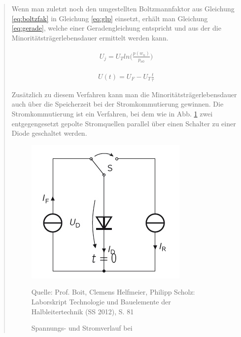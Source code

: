 \begin{quote}
	Wenn man zuletzt noch den umgestellten Boltzmannfaktor aus Gleichung
	\ref{eq:boltzfak} in Gleichung \ref{eq:glp} einsetzt, erhält man Gleichung
	\ref{eq:gerade}, welche einer Geradengleichung entspricht und aus der die
	Minoritätsträgerlebensdauer ermittelt werden kann.

	\begin{equation}
         \begin{split}
             U_{j}=U_{T}ln\Big(\frac{p(w_{n})}{p_{n0}}\Big)
         \end{split}
         \label{eq:boltzfak}
    \end{equation}

	\begin{equation}
         \begin{split}
             U(t)=U_{F}-U_{T}\frac{t}{\tau}
         \end{split}
         \label{eq:gerade}
    \end{equation}

	Zusätzlich zu diesem Verfahren kann man die Minoritätsträgerlebensdauer auch
	über die Speicherzeit bei der Stromkommutierung gewinnen. Die
	Stromkommutierung ist ein Verfahren, bei dem wie in Abb. \ref{fig:komm} zwei
	entgegengesetzt gepolte Stromquellen parallel über einen Schalter zu einer
	Diode geschaltet werden.

	\vspace{2em}

	\begin{figure}[H]
        \centering
        \includegraphics[scale=1]{./SchaltverhaltenBilder/Kommutierschaltung.jpg}
        \caption{Spannungs- und Stromverlauf bei }
             \begin{center}
                 \small Quelle: Prof. Boit, Clemens Helfmeier, Philipp Scholz: Laborskript Technologie und Bauelemente der Halbleitertechnik (SS 2012), S. 81
             \end{center}
        \label{fig:komm}
    \end{figure}


\end{quote}
